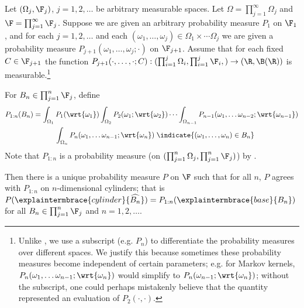 \documentclass{article} %
\newcommand{\cylinder}[1]{\widehat{#1}}
\begin{document}
\begin{theorem}
Let $(\Omega_j, \F_j)$, $j=1,2,\hdots$ be arbitrary measurable spaces.  Let $\Omega = \prod_{j=1}^\infty \Omega_j$ and   $\F = \prod_{j=1}^\infty \F_j$.  Suppose we are given an arbitrary probability measure $P_1$ on $\F_1$, and for each $j=1,2,\hdots$ and each $(\omega_1, \hdots, \omega_j) \in \Omega_1 \times \cdots \Omega_j$ we are given a probability measure $P_{j+1}(\omega_1, \hdots, \omega_j; \cdot)$ on $\F_{j+1}$.  Assume that for each fixed $C \in \F_{j+1}$ the function $P_{j+1}(\cdot, \hdots, \cdot; C) : (\prod_{i=1}^j \Omega_i, \prod_{i=1}^j \F_i, ) \to (\R, \B(\R))$ is measurable.\footnote{Unlike \cite{ash2000probability}, we use a subscript (e.g. $P_{n}$) to differentiate the probability measures over different spaces. We justify this because sometimes these probability measures become independent of certain parameters; e.g. for Markov kernels, $P_n(\omega_1, \hdots \omega_{n-1}; \wrt{\omega_{n}})$ would simplify to $P_n(\omega_{n-1}; \wrt{\omega_{n}})$; without the subscript, one could perhaps mistakenly believe that the quantity represented an evaluation of $P_2(\cdot, \cdot)$.}  

For $B_n \in \prod_{j=1}^n \F_j$, define  
\begin{align}
P_{1:n}(B_n) &= \int_{\Omega_1} P_1(\wrt{\omega_1}) \int_{\Omega_2} P_2(\omega_1; \wrt{\omega_2}) \cdots \int_{\Omega_{n-1}} P_{n-1}(\omega_1, \hdots \omega_{n-2}; \wrt{\omega_{n-1}})  
\nonumber 
 \\
& \quad \quad \quad \int_{\Omega_{n}} P_n(\omega_1, \hdots \omega_{n-1}; \wrt{\omega_{n}}) \;\indicate{(\omega_1,\hdots, \omega_n) \in B_n}  
\label{eqn:product_measure_in_n_coordinates}
\end{align}	
Note that $P_{1:n}$ is a probability measure (on $(\prod_{j=1}^n \Omega_j, \prod_{j=1}^n \F_j)$) by \cite[Thm.~2.6.7]{ash2000probability}.

Then there is a unique probability measure $P$ on $\F$ such that for all $n$, $P$ agrees with $P_{1:n}$ on $n$-dimensional cylinders; that is $P(\explaintermbrace{cylinder}{\cylinder{B_n}}) = P_{1:n}(\explaintermbrace{base}{B_n})$ for all $B_n \in \prod_{j=1}^n \F_j$ and $n=1,2,\hdots$. 
\label{thm:extended_product_measure_theorem_over_countably_infinite_spaces}
\end{theorem}
\end{document}
